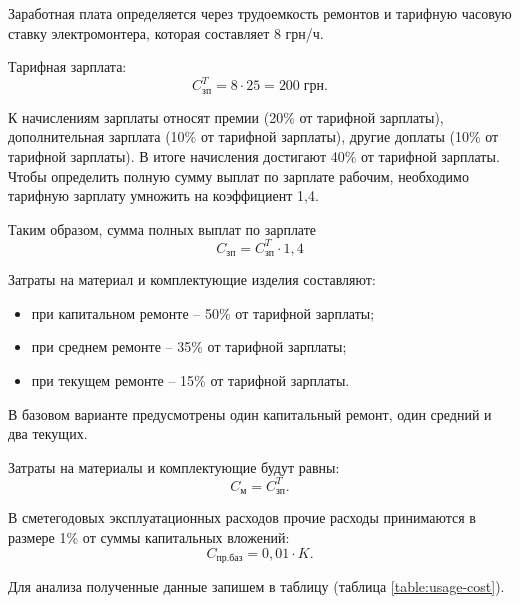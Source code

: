         Заработная плата определяется через трудоемкость ремонтов и тарифную
        часовую ставку электромонтера, которая составляет 8 грн/ч.

        Тарифная зарплата:
        \begin{equation}
            C_\text{зп}^T = 8 \cdot 25 = 200 \; \text{грн}. 
        \end{equation}

        К начислениям зарплаты относят премии (20\% от тарифной зарплаты),
        дополнительная зарплата (10\% от тарифной зарплаты), другие доплаты
        (10\% от тарифной зарплаты). В итоге начисления достигают 40\% от
        тарифной зарплаты.  Чтобы определить полную сумму выплат по зарплате
        рабочим, необходимо тарифную зарплату умножить на коэффициент 1,4.

        Таким образом, сумма полных выплат по зарплате
        \begin{equation}
            C_\text{зп} = C_\text{зп}^T \cdot 1,4
        \end{equation}

        Затраты на материал и комплектующие изделия составляют:
        \begin{itemize}
            \item при капитальном ремонте – 50\% от тарифной зарплаты;
            \item при среднем ремонте – 35\% от тарифной зарплаты;
            \item при текущем ремонте – 15\% от тарифной зарплаты.
        \end{itemize}

        В базовом варианте предусмотрены один капитальный ремонт, один средний
        и два текущих.

        Затраты на материалы и комплектующие будут равны:
        \begin{equation}
            C_\text{м} = C_\text{зп}^T. 
        \end{equation}

        В сметегодовых эксплуатационных расходов прочие расходы принимаются в
        размере 1\% от суммы капитальных вложений:
        \begin{equation}
            C_\text{пр.баз} = 0,01 \cdot K.
        \end{equation}

        Для анализа полученные данные запишем в таблицу (таблица
        \ref{table:usage-cost}).


